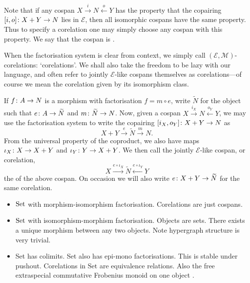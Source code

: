 Note that if any cospan $X \stackrel{i}\longrightarrow N
\stackrel{o}\longleftarrow Y$ has the property that the copairing $[i,o]{\colon}
X+Y \to N$ lies in $\mathcal E$, then all isomorphic cospans have the same
property. Thus to specify a corelation one may simply choose any cospan with
this property. We say that the cospan is .

When the factorisation system is clear from context, we simply call $(\mathcal
E,\mathcal M)$-corelations: `corelations'. We shall also take the freedom to be
lazy with our language, and often refer to jointly $\mathcal E$-like cospans
themselves as corelations---of course we mean the corelation given by its
isomorphism class.

If $f{\colon} A \to N$ is a morphism with factorisation $f = m \circ e$, write
$\widetilde N$ for the object such that $e{\colon} A \to \widetilde N$ and $m{\colon}
\widetilde N \to N$. Now, given a cospan $X \stackrel{i_X}{\longrightarrow} N
\stackrel{o_Y}{\longleftarrow} Y$, we may use the factorisation system to write
the copairing $[i_X,o_Y]{\colon} X+Y \to N$ as
\[
  X+Y \stackrel{e}{\longrightarrow} \widetilde{N} \stackrel{m}{\longrightarrow}
  N.
\]
From the universal property of the coproduct, we also have maps $\iota_X{\colon} X
\to X+Y$ and $\iota_Y{\colon} Y \to X+Y$. We then call the jointly $\mathcal
E$-like cospan, or corelation,
\[
  X \stackrel{e\circ \iota_X}{\longrightarrow} \widetilde{N} \stackrel{e \circ
  \iota_Y}{\longleftarrow} Y
\]
the  of the above cospan. On occasion we will also
write $e{\colon} X+Y \to \widetilde N$ for the same corelation.

\begin{examples}
  \begin{itemize}
    \item $\mathrm{Set}$ with morphism-isomorphism factorisation. Corelations are just cospans.
    \item $\mathrm{Set}$ with isomorphism-morphism factorisation. Objects are sets. There exists
      a unique morphism between any two objects. Note hypergraph structure is very
      trivial.
    \item Set has colimits. Set also has epi-mono factorisations. This is stable under
  pushout. Corelations in $\mathrm{Set}$ are equivalence relations. Also the free
  extraspecial commutative Frobenius monoid on one object \cite{CF}.
  \end{itemize}
\end{examples}

